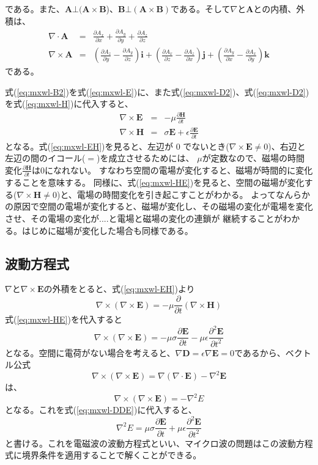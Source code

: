 である。また、$\bm{A}\bot(\bm{A}\times\bm{B}$)、$\bm{B}\bot(\bm{A}\times\bm{B})$である。そして$\nabla$と$\bm{A}$との内積、外積は、
\begin{eqnarray*}
\nabla \cdot \bm{A} &=& \frac{\partial A_x}{\partial x} + \frac{\partial A_y}{\partial y} + \frac{\partial A_z}{\partial z} \\
\nabla \times\bm{A} &=& (\frac{\partial A_z}{\partial y} - \frac{\partial A_y}{\partial z})\bm{i} + (\frac{\partial A_x}{\partial z} - \frac{\partial A_z}{\partial x})\bm{j} + (\frac{\partial A_y}{\partial x} - \frac{\partial A_x}{\partial y})\bm{k}
\end{eqnarray*}
である。

式(\ref{eq:mxwl-B2})を式(\ref{eq:mxwl-E})に、また式(\ref{eq:mxwl-D2})、式(\ref{eq:mxwl-D2})を式(\ref{eq:mxwl-H})に代入すると、
\begin{eqnarray}
\nabla \times \bm{E} &=& -\mu\frac{\partial \bm{H}}{\partial t} \label{eq:mxwl-EH}\\
\nabla \times \bm{H} &=& \sigma\bm{E} + \epsilon\frac{\partial \bm{E}}{\partial t} \label{eq:mxwl-HE}
\end{eqnarray}
となる。式(\ref{eq:mxwl-EH})を見ると、左辺が $0$ でないとき($\nabla\times\bm{E}\neq 0$)、右辺と左辺の間のイコール($=$)を成立させるためには、
$\mu$が定数なので、磁場の時間変化$\frac{\partial \bm{H}}{\partial t}$は$0$になれない。
すなわち空間の電場が変化すると、磁場が時間的に変化することを意味する。
同様に、式(\ref{eq:mxwl-HE})を見ると、空間の磁場が変化する($\nabla\times\bm{H}\neq 0$)と、電場の時間変化を引き起こすことがわかる。
よってなんらかの原因で空間の電場が変化すると、磁場が変化し、その磁場の変化が電場を変化させ、その電場の変化が....と電場と磁場の変化の連鎖が
継続することがわかる。はじめに磁場が変化した場合も同様である。

\subsection{波動方程式}
$\nabla$と$\nabla\times\bm{E}$の外積をとると、式(\ref{eq:mxwl-EH})より
\[
\nabla\times(\nabla\times\bm{E}) = -\mu \frac{\partial}{\partial t}(\nabla\times\bm{H})
\]
式(\ref{eq:mxwl-HE})を代入すると
\begin{equation}
\nabla\times(\nabla\times\bm{E}) = -\mu \sigma\frac{\partial\bm{E}}{\partial t} - \mu\epsilon\frac{\partial^2 \bm{E}}{\partial t^2} \label{eq:mxwl-DDE}
\end{equation}
となる。空間に電荷がない場合を考えると、$\nabla\bm{D}=\epsilon\nabla\bm{E} = 0$であるから、ベクトル公式
\[\nabla\times(\nabla\times\bm{E}) = \nabla(\nabla\cdot\bm{E})-\nabla^2\bm{E}
\]
は、
\[
\nabla\times(\nabla\times\bm{E}) = -\nabla^2 E
\]
となる。これを式(\ref{eq:mxwl-DDE})に代入すると、
\begin{equation}
\nabla^2 E = \mu \sigma\frac{\partial\bm{E}}{\partial t} + \mu\epsilon\frac{\partial^2 \bm{E}}{\partial t^2} \label{eq:mxwl-wveq}
\end{equation}
と書ける。これを電磁波の波動方程式といい、マイクロ波の問題はこの波動方程式に境界条件を適用することで解くことができる。


